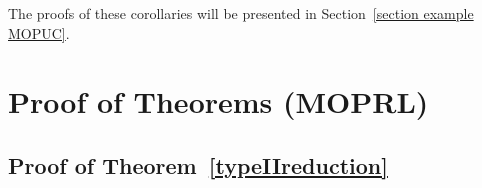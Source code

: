 \documentclass[a4paper,10pt,leqno]{amsart}
\numberwithin{equation}{section}
\newtheorem{proposition}[theorem]{Proposition}
\theoremstyle{remark}
\newcommand{\R}{\mathbb{R}}
\begin{document}

The proofs of these corollaries will be presented in Section~\ref{section example MOPUC}.

\section{Proof of Theorems (MOPRL)} \label{section proofs}

\subsection{Proof of Theorem~\ref{typeIIreduction}}
\end{document}
